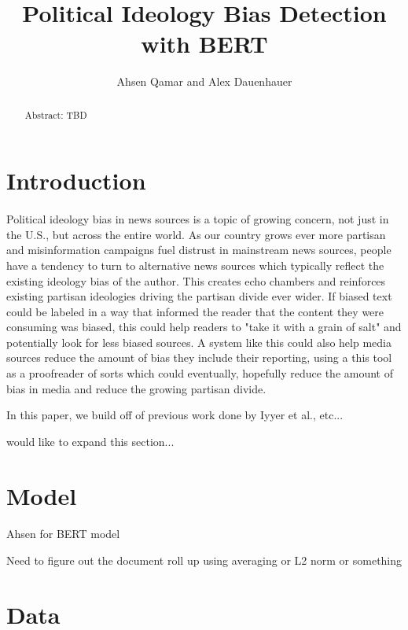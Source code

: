 \documentclass[10pt,a4paper,onecolumn]{article}
\title{Political Ideology Bias Detection with BERT}
\author{Ahsen Qamar and Alex Dauenhauer}
\begin{document}
\maketitle

\begin{abstract}
Abstract: TBD
\end{abstract}

\section{Introduction}
\paragraph{}
Political ideology bias in news sources is a topic of growing concern, not just in the U.S., but across the entire world. As our country grows ever more partisan and misinformation campaigns fuel distrust in mainstream news sources, people have a tendency to turn to alternative news sources which typically reflect the existing ideology bias of the author. This creates echo chambers and reinforces existing partisan ideologies driving the partisan divide ever wider. If biased text could be labeled in a way that informed the reader that the content they were consuming was biased, this could help readers to "take it with a grain of salt" and potentially look for less biased sources. A system like this could also help media sources reduce the amount of bias they include their reporting, using a this tool as a proofreader of sorts which could eventually, hopefully reduce the amount of bias in media and reduce the growing partisan divide.

In this paper, we build off of previous work done by Iyyer et al., etc...

would like to expand this section...

\section{Model}
\paragraph{}
Ahsen for BERT model

Need to figure out the document roll up using averaging or L2 norm or something

\section{Data}
\end{document}

